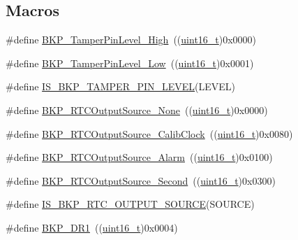 \subsection*{Macros}
\begin{DoxyCompactItemize}
\item 
\#define \hyperlink{group___tamper___pin__active__level_gae7203c3c0202cd68d201278c8be2b967}{B\+K\+P\+\_\+\+Tamper\+Pin\+Level\+\_\+\+High}~((\hyperlink{_p_e___types_8h_a1f1825b69244eb3ad2c7165ddc99c956}{uint16\+\_\+t})0x0000)
\item 
\#define \hyperlink{group___tamper___pin__active__level_gade9fc51f494eddcc4d88679c80fe39ce}{B\+K\+P\+\_\+\+Tamper\+Pin\+Level\+\_\+\+Low}~((\hyperlink{_p_e___types_8h_a1f1825b69244eb3ad2c7165ddc99c956}{uint16\+\_\+t})0x0001)
\item 
\#define \hyperlink{group___tamper___pin__active__level_gae7cd3bd314605f7752062c814b850c23}{I\+S\+\_\+\+B\+K\+P\+\_\+\+T\+A\+M\+P\+E\+R\+\_\+\+P\+I\+N\+\_\+\+L\+E\+V\+EL}(L\+E\+V\+EL)
\item 
\#define \hyperlink{group___r_t_c__output__source__to__output__on__the___tamper__pin_ga8a18950396b2db70311480ab76464c6e}{B\+K\+P\+\_\+\+R\+T\+C\+Output\+Source\+\_\+\+None}~((\hyperlink{_p_e___types_8h_a1f1825b69244eb3ad2c7165ddc99c956}{uint16\+\_\+t})0x0000)
\item 
\#define \hyperlink{group___r_t_c__output__source__to__output__on__the___tamper__pin_ga6fd7cb80bb52bca65641cbe6aa2c4590}{B\+K\+P\+\_\+\+R\+T\+C\+Output\+Source\+\_\+\+Calib\+Clock}~((\hyperlink{_p_e___types_8h_a1f1825b69244eb3ad2c7165ddc99c956}{uint16\+\_\+t})0x0080)
\item 
\#define \hyperlink{group___r_t_c__output__source__to__output__on__the___tamper__pin_gac016224386421d0cb1c0cd0ee201d65a}{B\+K\+P\+\_\+\+R\+T\+C\+Output\+Source\+\_\+\+Alarm}~((\hyperlink{_p_e___types_8h_a1f1825b69244eb3ad2c7165ddc99c956}{uint16\+\_\+t})0x0100)
\item 
\#define \hyperlink{group___r_t_c__output__source__to__output__on__the___tamper__pin_ga23cb72635820331317ee4ee5a7897a70}{B\+K\+P\+\_\+\+R\+T\+C\+Output\+Source\+\_\+\+Second}~((\hyperlink{_p_e___types_8h_a1f1825b69244eb3ad2c7165ddc99c956}{uint16\+\_\+t})0x0300)
\item 
\#define \hyperlink{group___r_t_c__output__source__to__output__on__the___tamper__pin_gac59454ee255feb55b5e14c34b70c99da}{I\+S\+\_\+\+B\+K\+P\+\_\+\+R\+T\+C\+\_\+\+O\+U\+T\+P\+U\+T\+\_\+\+S\+O\+U\+R\+CE}(S\+O\+U\+R\+CE)
\item 
\#define \hyperlink{group___data___backup___register_ga5d4c3eeaccafcfc0ee3b5dc01381bab0}{B\+K\+P\+\_\+\+D\+R1}~((\hyperlink{_p_e___types_8h_a1f1825b69244eb3ad2c7165ddc99c956}{uint16\+\_\+t})0x0004)

\end{DoxyCompactItemize}
